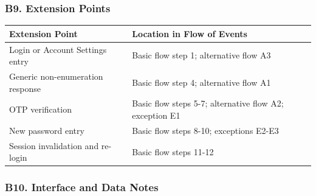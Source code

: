 \documentclass[12pt]{article}
\renewcommand{\baselinestretch}{1.5}
\begin{document}
\hypertarget{sec:b9-extension-points}{}
\subsubsection*{B9. Extension Points}
\par\medskip

\begingroup
\small
\renewcommand{\baselinestretch}{1.0}\selectfont
\renewcommand{\arraystretch}{1.15}
\setlength{\tabcolsep}{6pt}
\begin{longtable}{|>{\raggedright\arraybackslash}p{}|>{\raggedright\arraybackslash}p{}|}
\hline
\textbf{Extension Point} & \textbf{Location in Flow of Events} \\ \hline
\endhead
Login or Account Settings entry & Basic flow step 1; alternative flow A3 \\ \hline
Generic non-enumeration response & Basic flow step 4; alternative flow A1 \\ \hline
OTP verification & Basic flow steps 5-7; alternative flow A2; exception E1 \\ \hline
New password entry & Basic flow steps 8-10; exceptions E2-E3 \\ \hline
Session invalidation and re-login & Basic flow steps 11-12 \\ \hline
\end{longtable}
\endgroup
\par\medskip

\hypertarget{sec:b10-interface-and-data-notes}{}
\subsubsection*{B10. Interface and Data Notes}
\par\medskip
\end{document}
